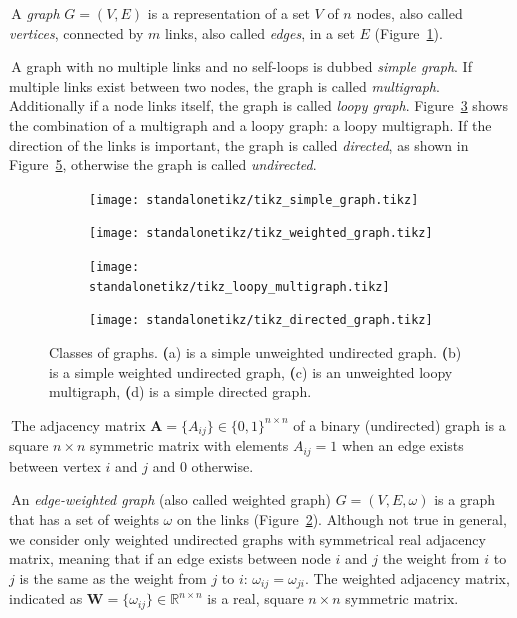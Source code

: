 \noindent\textbullet \,A \emph{graph} $G=(V,E)$ is a representation of a set $V$ of $n$ nodes, also called \emph{vertices}, connected by $m$ links, also called \emph{edges}, in a set $E$ (Figure~\ref{fig:simple_unweighted_graph}).

\noindent\textbullet \,A graph with no multiple links and no self-loops is dubbed \emph{simple graph}.
If multiple links exist between two nodes, the graph is called \emph{multigraph}.
Additionally if a node links itself, the graph is called \emph{loopy graph}.
Figure~\ref{fig:loopy_multigraph} shows the combination of a multigraph and a loopy graph: a loopy multigraph.
If the direction of the links is important, the graph is called \emph{directed}, as shown in Figure~\ref{fig:directedgraph}, otherwise the graph is called \emph{undirected}.

\begin{figure}[htb!]
\centering
	\begin{subfigure}[hb]{0.4\textwidth}\centering
		\texttt{[image: standalonetikz/tikz\_simple\_graph.tikz]}
		\caption{}
		\label{fig:simple_unweighted_graph}
	\end{subfigure}
	\begin{subfigure}[hb]{0.4\textwidth}\centering
	\texttt{[image: standalonetikz/tikz\_weighted\_graph.tikz]}
	\caption{}
	\label{fig:simple_weighted_graph}
	\end{subfigure}
	\begin{subfigure}[hb]{0.4\textwidth}\centering
	\texttt{[image: standalonetikz/tikz\_loopy\_multigraph.tikz]}
	\caption{}
	\label{fig:loopy_multigraph}
	\end{subfigure}
	\begin{subfigure}[hb]{0.4\textwidth}\centering
	\texttt{[image: standalonetikz/tikz\_directed\_graph.tikz]}
	\caption{}
	\label{fig:directedgraph}
	\end{subfigure}
	\caption{Classes of graphs. {\textbf (a)} is a simple unweighted undirected graph. {\textbf (b)} is a simple weighted undirected graph, {\textbf (c)} is an unweighted loopy multigraph, {\textbf (d)} is a simple directed graph.}
\end{figure}

\noindent\textbullet \,The adjacency matrix $\mathbf{A}=\{A_{ij}\} \in \{0,1\}^{n \times n}$ of a binary (undirected) graph is a square $n\times n$ symmetric matrix with elements $A_{ij}=1$ when an edge exists between vertex $i$ and $j$ and $0$ otherwise.

\noindent\textbullet \,An \emph{edge-weighted graph} (also called weighted graph) $G=(V,E,\omega)$ is a graph that has a set of weights $\omega$ on the links (Figure~\ref{fig:simple_weighted_graph}). Although not true in general, we consider only weighted undirected graphs with symmetrical real adjacency matrix, meaning that if an edge exists between node $i$ and $j$ the weight from $i$ to $j$ is the same as the weight from $j$ to $i$: $\omega_{ij}=\omega_{ji}$. The weighted adjacency matrix,  indicated as $\mathbf{W}=\{ \omega_{ij} \} \in \mathbb{R}^{n\times n}$ is a real, square $n \times n$ symmetric matrix.

